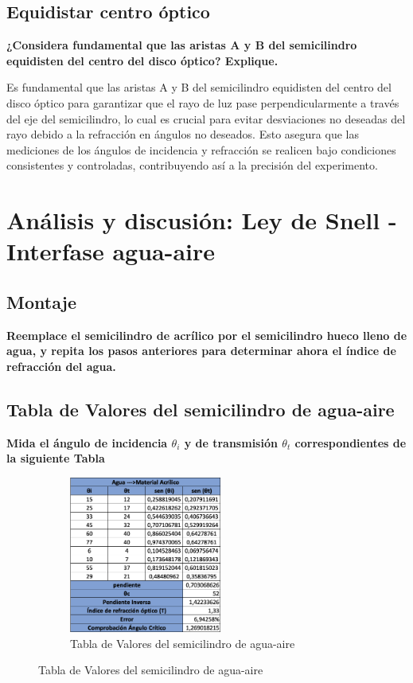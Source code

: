 \subsection{Equidistar centro óptico}
\textbf{¿Considera fundamental que las aristas A y B del semicilindro equidisten del
centro del disco óptico? Explique.}

Es fundamental que las aristas A y B del semicilindro equidisten del centro del disco óptico para garantizar que el rayo de luz pase perpendicularmente a través del eje del semicilindro, lo cual es crucial para evitar desviaciones no deseadas del rayo debido a la refracción en ángulos no deseados. Esto asegura que las mediciones de los ángulos de incidencia y refracción se realicen bajo condiciones consistentes y controladas, contribuyendo así a la precisión del experimento.


\section{Análisis y discusión: Ley de Snell - Interfase agua-aire}
\subsection{Montaje}
\textbf{Reemplace el semicilindro de acrílico por el semicilindro hueco lleno de agua, y
repita los pasos anteriores para determinar ahora el índice de refracción del agua.}

\subsection{Tabla de Valores del semicilindro de agua-aire}
\textbf{Mida el ángulo de incidencia $\theta_{i}$ y de transmisión $\theta_{t}$ correspondientes de la siguiente Tabla}

\begin{figure}[H]
  \centering
  \begin{subfigure}[b]{\textwidth}
      \centering
      \includegraphics[width=0.55\textwidth]{Figures/1. Content/tabla2.png}
      \caption{Tabla de Valores del semicilindro de agua-aire}
      \label{fig: Tabla 2}
  \end{subfigure}
  \hfill
\end{figure}


